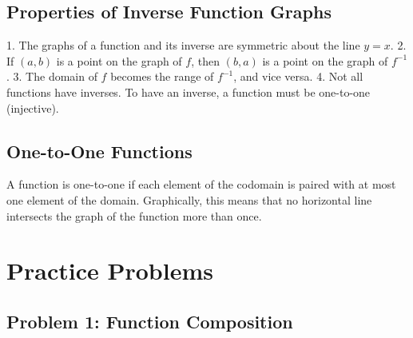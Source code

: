 \documentclass[12pt]{article}
\begin{document}
\newpage
\subsection{Properties of Inverse Function Graphs}

1. The graphs of a function and its inverse are symmetric about the line $y = x$.
2. If $(a, b)$ is a point on the graph of $f$, then $(b, a)$ is a point on the graph of $f^{-1}$.
3. The domain of $f$ becomes the range of $f^{-1}$, and vice versa.
4. Not all functions have inverses. To have an inverse, a function must be one-to-one (injective).

\subsection{One-to-One Functions}

A function is one-to-one if each element of the codomain is paired with at most one element of the domain. Graphically, this means that no horizontal line intersects the graph of the function more than once.

\begin{center}
\end{center}

\section{Practice Problems}

\subsection{Problem 1: Function Composition}
\end{document}
